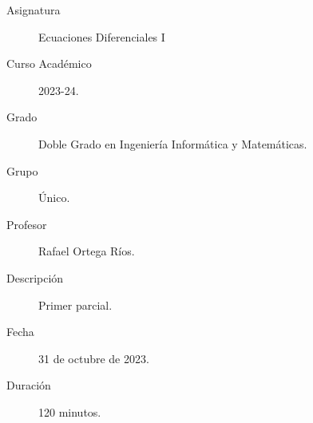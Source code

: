 \documentclass[12pt]{article}
\begin{document}

    
    

    \begin{description}
        \item[Asignatura] Ecuaciones Diferenciales I
        \item[Curso Académico] 2023-24.
        \item[Grado] Doble Grado en Ingeniería Informática y Matemáticas.
        \item[Grupo] Único.
        \item[Profesor] Rafael Ortega Ríos.
        \item[Descripción] Primer parcial.
        \item[Fecha] 31 de octubre de 2023.
        \item[Duración] 120 minutos.
    
    \end{description}
    \newpage
    
\end{document}
